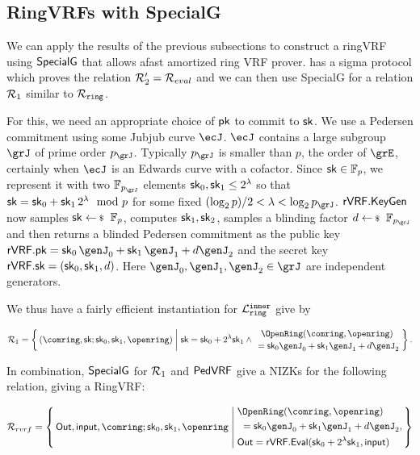 \subsection{RingVRFs with SpecialG}
\label{subsec:rvrf_faster}

We can apply the results of the previous subsections to construct a ringVRF using ${\mathsf{SpecialG}}$ that allows afast amortized ring VRF prover. \PedVRF has a sigma protocol which proves the relation $\mathcal{R}_2'=\mathcal{R}_{eval}$ and we can then use SpecialG for a relation $\mathcal{R}_1$ similar to $\mathcal{R}_{\mathtt{ring}}$.

For this, we need an appropriate choice of $\mathsf{pk}$ to commit to $\mathsf{sk}$. We use a Pedersen commitment using some Jubjub curve $\ecJ$. $\ecJ$ contains a large subgroup $\grJ$ of prime order $p_\grJ$. Typically $p_\grJ$ is smaller than $p$, the order of $\grE$, certainly when $\ecJ$ is an Edwards curve with a cofactor. Since $\mathsf{sk} \in \mathbb{F}_p$, we represent it with two $\F_{p_\grJ}$ elements $\mathsf{sk}_0,\mathsf{sk}_1 \leq 2^{\lambda}$ 
so that $\mathsf{sk} = \mathsf{sk}_0 + \mathsf{sk}_1 \, 2^{\lambda} \mod p$ for some fixed $(\log_2 p)/2  < \lambda < \log_2 p_\grJ$. ${\mathsf{rVRF}}.{\mathsf{KeyGen}}$ now samples $\sk\leftsample \F_{p}$, computes $\mathsf{sk}_1,\mathsf{sk}_2$, samples a blinding factor $d \leftsample \F_{p_\grJ}$ and then returns a blinded Pedersen commitment as the public key $\rVRF.\pk=\sk_0\, \genJ_0 + \sk_1\, \genJ_1 + d \genJ_2$ and the secret key ${\mathsf{rVRF}}.\mathsf{sk} = (\mathsf{sk}_0,\mathsf{sk}_1,d)$. Here $\genJ_0,\genJ_1,\genJ_2 \in \grJ$ are independent generators.

We thus have a fairly efficient instantiation for $\mathcal{L}_{\mathtt{ring}}^{\mathtt{inner}}$ give by

$$ \relone = \Setst{ (\comring, \sk ; \sk_0, \sk_1,\openring) }{
  \sk = \sk_0+ 2^{\lambda} \sk_1 \wedge
 \genfrac{}{}{0pt}{}{ \eprint{\rVRF.}{}\OpenRing(\comring,\openring) }{ \,\, = \sk_0 \genJ_0 + \sk_1 \genJ_1 + d \genJ_2 }
} \mathperiod $$

In combination, ${\mathsf{SpecialG}}$ for $\mathcal{R}_1$ and ${\mathsf{PedVRF}}$ give a NIZKs for the following relation, giving a RingVRF:

$$ \rel_{rvrf} = \Setst{ \Out, \msg, \comring ; \sk_0,\sk_1,\openring }{
    \eprint{
        \eprint{\rVRF.}{}\OpenRing(\comring,\openring)    \textrm{ and }
        \,\, = \sk_0 \genJ_0 + \sk_1 \genJ_1 + d \genJ_2, \quad
        \Out = \rVRF.\Eval(\sk_0+ 2^{\lambda} \sk_1,\msg)
    }{
        \begin{aligned}
        & \eprint{\rVRF.}{}\OpenRing(\comring,\openring) \\
        & \,\, = \sk_0 \genJ_0 + \sk_1 \genJ_1 + d \genJ_2,\\
        & \Out = \rVRF.\Eval(\sk_0+ 2^{\lambda} \sk_1,\msg)
        \end{aligned}
    }
} $$

